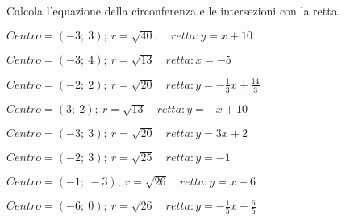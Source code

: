 \newpage

\begin{esercizio}\label{ese:}
 Calcola l'equazione della circonferenza e le intersezioni con la retta.
 \begin{enumeratea}
  \item  \(Centro=\left (-3;~3 \right );~r = \sqrt{40}; \quad
           retta: y = x +10\)\\
   \makebox[\linewidth][r]
   {[\(x^2 + y^2 +6x -6y -22 = 0; \quad A = \left (-1;~9 \right );~B = 
\left (-9;~1 \right )\)]}
  \item  \(Centro=\left (-3;~4 \right );~r = \sqrt{13} \quad
           retta: x = -5\)\\
  \makebox[\linewidth][r]
   {[\(x^2 + y^2 +6x -8y +12 = 0; \quad A = \left (-5;~1 \right );~B = 
\left (-5;~7 \right )\)]}
  \item  \(Centro=\left (-2;~2 \right );~r = \sqrt{20} \quad
           retta: y = 
-\frac{1}{3} x +\frac{14}{3}\)\\
  \makebox[\linewidth][r]
   {[\(x^2 + y^2 +4x -4y -12 = 0; \quad A = \left (-4;~6 \right );~B = 
\left (2;~4 \right )\)]}
  \item  \(Centro=\left (3;~2 \right );~r = \sqrt{13} \quad
           retta: y = - x 
+10\)\\
  \makebox[\linewidth][r]
   {[\(x^2 + y^2 -6x -4y  = 0; \quad A = \left (5;~5 \right );~B = \left 
(6;~4 \right )\)]}
  \item  \(Centro=\left (-3;~3 \right );~r = \sqrt{20} \quad
           retta: y = 3 x 
+2\)\\
  \makebox[\linewidth][r]
   {[\(x^2 + y^2 +6x -6y -2 = 0; \quad A = \left (-1;~-1 \right );~B = 
\left (1;~5 \right )\)]}
  \item  \(Centro=\left (-2;~3 \right );~r = \sqrt{25} \quad
           retta: y = -1\)\\
  \makebox[\linewidth][r]
   {[\(x^2 + y^2 +4x -6y -12 = 0; \quad A = \left (1;~-1 \right );~B = 
\left (-5;~-1 \right )\)]}
  \item  \(Centro=\left (-1;~-3 \right );~r = \sqrt{26} \quad
           retta: y = x -6\)\\
  \makebox[\linewidth][r]
   {[\(x^2 + y^2 +2x +6y -16 = 0; \quad A = \left (-2;~-8 \right );~B = 
\left (4;~-2 \right )\)]}
  \item  \(Centro=\left (-6;~0 \right );~r = \sqrt{26} \quad
           retta: y = 
-\frac{1}{5} x -\frac{6}{5}\)\\
  \makebox[\linewidth][r]
   {[\(x^2 + y^2 +12x +10 = 0; \quad A = \left (-11;~1 \right );~B = 
}
\end{enumeratea}
\end{esercizio}
